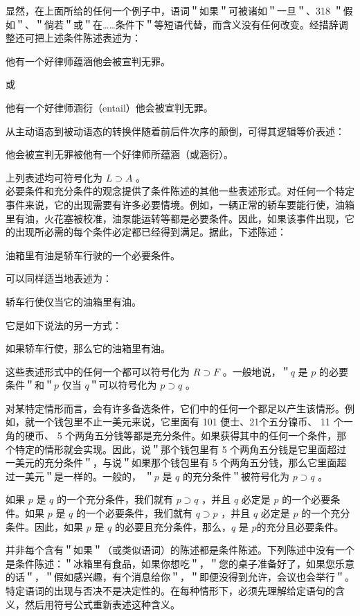 显然，在上面所给的任何一个例子中，语词＂如果＂可被诸如＂一旦＂、318 ＂假如＂、＂倘若＂或＂在……条件下＂等短语代替，而含义没有任何改变。经措辞调整还可把上述条件陈述表述为：

他有一个好律师蕴涵他会被宣判无罪。

或

他有一个好律师涵衍（entail）他会被宣判无罪。

从主动语态到被动语态的转换伴随着前后件次序的颠倒，可得其逻辑等价表述：

他会被宣判无罪被他有一个好律师所蕴涵（或涵衍）。

上列表述均可符号化为 $L \supset A$ 。\\
必要条件和充分条件的观念提供了条件陈述的其他一些表述形式。对任何一个特定事件来说，它的出现需要有许多必要情境。例如，一辆正常的轿车要能行使，油箱里有油，火花塞被校准，油泵能运转等都是必要条件。因此，如果该事件出现，它的出现所必需的每个条件必定都已经得到满足。据此，下述陈述：

油箱里有油是轿车行驶的一个必要条件。

可以同样适当地表述为：

轿车行使仅当它的油箱里有油。

它是如下说法的另一方式：

如果轿车行使，那么它的油箱里有油。

这些表述形式中的任何一个都可以符号化为 $R \supset F$ 。一般地说，＂$q$ 是 $p$ 的必要条件＂和＂$p$ 仅当 $q$＂可以符号化为 $p \supset q$ 。

对某特定情形而言，会有许多备选条件，它们中的任何一个都足以产生该情形。例如，就一个钱包里不止一美元来说，它里面有 101 便士、21个五分镍币、 11 个一角的硬币、 5 个两角五分钱等都是充分条件。如果获得其中的任何一个条件，那个特定的情形就会实现。因此，说＂那个钱包里有 5 个两角五分钱是它里面超过一美元的充分条件＂，与说＂如果那个钱包里有 5 个两角五分钱，那么它里面超过一美元＂是一样的。一般的， ＂$p$ 是 $q$ 的充分条件＂被符号化为 $p \supset q$ 。

如果 $p$ 是 $q$ 的一个充分条件，我们就有 $p \supset q$ ，并且 $q$ 必定是 $p$ 的一个必要条件。如果 $p$ 是 $q$ 的一个必要条件，我们就有 $q \supset p$ ，并且 $q$ 必定是 $p$ 的一个充分条件。因此，如果 $p$ 是 $q$ 的必要且充分条件，那么，$q$ 是 $p$的充分且必要条件。

并非每个含有＂如果＂（或类似语词）的陈述都是条件陈述。下列陈述中没有一个是条件陈述：＂冰箱里有食品，如果你想吃＂，＂您的桌子准备好了，如果您乐意的话＂，＂假如感兴趣，有个消息给你＂，＂即便没得到允许，会议也会举行＂。特定语词的出现与否决不是决定性的。在每种情形下，必须先理解给定语句的含义，然后用符号公式重新表述这种含义。

